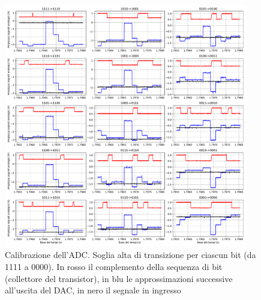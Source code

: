 \documentclass[journal]{IEEEtran}
\begin{document}
\begin{figure}[t]%
\centering
\includegraphics[trim = {30 0 50 0}, width=0.95\textwidth]{analysis/output/calibration.pdf}
\caption{Calibrazione dell'ADC. Soglia alta di transizione per ciascun bit (da 1111 a 0000). In rosso il complemento della sequenza di bit (collettore del transistor), in blu le approssimazioni successive all'uscita del DAC, in nero il segnale in ingresso}
\label{fig:BIT_high_transition_threshold}
\end{figure}

\end{document}

